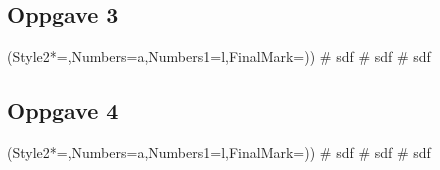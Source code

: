 \subsection*{Oppgave 3}
\begin{easylist}[enumerate]
	\ListProperties(Style2*=,Numbers=a,Numbers1=l,FinalMark={)})
	# sdf
	# sdf
	# sdf
\end{easylist}


\subsection*{Oppgave 4}
\begin{easylist}[enumerate]
	\ListProperties(Style2*=,Numbers=a,Numbers1=l,FinalMark={)})
	# sdf
	# sdf
	# sdf
\end{easylist}





